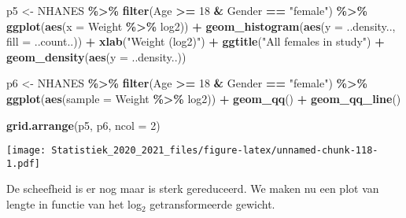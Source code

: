 \documentclass[
  12pt,dutch,coursenotes]{book}
\newenvironment{Shaded}{\begin{snugshade}}{\end{snugshade}}
\newcommand{\DataTypeTok}[1]{\textcolor[rgb]{0.13,0.29,0.53}{#1}}
\newcommand{\DecValTok}[1]{\textcolor[rgb]{0.00,0.00,0.81}{#1}}
\newcommand{\KeywordTok}[1]{\textcolor[rgb]{0.13,0.29,0.53}{\textbf{#1}}}
\newcommand{\NormalTok}[1]{#1}
\newcommand{\OperatorTok}[1]{\textcolor[rgb]{0.81,0.36,0.00}{\textbf{#1}}}
\newcommand{\StringTok}[1]{\textcolor[rgb]{0.31,0.60,0.02}{#1}}
\theoremstyle{definition}
\theoremstyle{definition}
\theoremstyle{definition}
\theoremstyle{remark}
\begin{document}
\begin{Shaded}
\begin{Highlighting}[]
\NormalTok{p5 \textless{}{-}}\StringTok{ }\NormalTok{NHANES }\OperatorTok{\%\textgreater{}\%}\StringTok{ }\KeywordTok{filter}\NormalTok{(Age }\OperatorTok{\textgreater{}=}\StringTok{ }\DecValTok{18} \OperatorTok{\&}\StringTok{ }\NormalTok{Gender }\OperatorTok{==}\StringTok{ "female"}\NormalTok{) }\OperatorTok{\%\textgreater{}\%}\StringTok{ }
\StringTok{    }\KeywordTok{ggplot}\NormalTok{(}\KeywordTok{aes}\NormalTok{(}\DataTypeTok{x =}\NormalTok{ Weight }\OperatorTok{\%\textgreater{}\%}\StringTok{ }\NormalTok{log2)) }\OperatorTok{+}\StringTok{ }\KeywordTok{geom\_histogram}\NormalTok{(}\KeywordTok{aes}\NormalTok{(}\DataTypeTok{y =}\NormalTok{ ..density.., }
    \DataTypeTok{fill =}\NormalTok{ ..count..)) }\OperatorTok{+}\StringTok{ }\KeywordTok{xlab}\NormalTok{(}\StringTok{"Weight (log2)"}\NormalTok{) }\OperatorTok{+}\StringTok{ }\KeywordTok{ggtitle}\NormalTok{(}\StringTok{"All females in study"}\NormalTok{) }\OperatorTok{+}\StringTok{ }
\StringTok{    }\KeywordTok{geom\_density}\NormalTok{(}\KeywordTok{aes}\NormalTok{(}\DataTypeTok{y =}\NormalTok{ ..density..))}

\NormalTok{p6 \textless{}{-}}\StringTok{ }\NormalTok{NHANES }\OperatorTok{\%\textgreater{}\%}\StringTok{ }\KeywordTok{filter}\NormalTok{(Age }\OperatorTok{\textgreater{}=}\StringTok{ }\DecValTok{18} \OperatorTok{\&}\StringTok{ }\NormalTok{Gender }\OperatorTok{==}\StringTok{ "female"}\NormalTok{) }\OperatorTok{\%\textgreater{}\%}\StringTok{ }
\StringTok{    }\KeywordTok{ggplot}\NormalTok{(}\KeywordTok{aes}\NormalTok{(}\DataTypeTok{sample =}\NormalTok{ Weight }\OperatorTok{\%\textgreater{}\%}\StringTok{ }\NormalTok{log2)) }\OperatorTok{+}\StringTok{ }\KeywordTok{geom\_qq}\NormalTok{() }\OperatorTok{+}\StringTok{ }
\StringTok{    }\KeywordTok{geom\_qq\_line}\NormalTok{()}

\KeywordTok{grid.arrange}\NormalTok{(p5, p6, }\DataTypeTok{ncol =} \DecValTok{2}\NormalTok{)}
\end{Highlighting}
\end{Shaded}

\texttt{[image: Statistiek\_2020\_2021\_files/figure-latex/unnamed-chunk-118-1.pdf]}

De scheefheid is er nog maar is sterk gereduceerd. We maken nu een plot van lengte in functie van het log\(_2\) getransformeerde gewicht.
\end{document}
